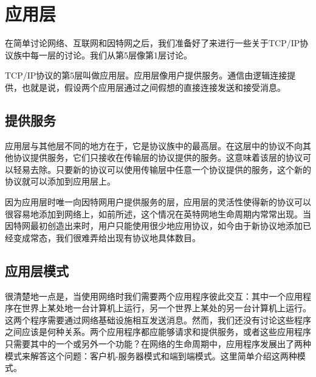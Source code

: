 \section{应用层}
在简单讨论网络、互联网和因特网之后，我们准备好了来进行一些关于TCP/IP协议族中每一层的讨论。我们从第5层像第1层讨论。

TCP/IP协议的第5层叫做应用层。应用层像用户提供服务。通信由逻辑连接提供，也就是说，假设两个应用层通过之间假想的直接连接发送和接受消息。

\subsection{提供服务}
应用层与其他层不同的地方在于，它是协议族中的最高层。在这层中的协议不向其他协议提供服务，它们只接收在传输层的协议提供的服务。这意味着该层的协议可以轻易去除。只要新的协议可以使用传输层中任意一个协议提供的服务，这个新的协议就可以添加到应用层上。

因为应用层时唯一向因特网用户提供服务的层，应用层的灵活性使得新的协议可以很容易地添加到网络上，如前所述，这个情况在英特网地生命周期内常常出现。当因特网最初创造出来时，用户只能使用很少地应用协议，如今由于新协议地添加已经变成常态，我们很难弄给出现有协议地具体数目。

\subsection{应用层模式}
很清楚地一点是，当使用网络时我们需要两个应用程序彼此交互：其中一个应用程序在世界上某处地一台计算机上运行，另一个世界上某处的另一台计算机上运行。这两个程序需要通过网络基础设施相互发送消息。然而，我们还没有讨论这些程序之间应该是何种关系。两个应用程序都应能够请求和提供服务，或者这些应用程序只需要其中的一个或另外一个功能？在网络的生命周期中，应用程序发展出了两种模式来解答这个问题：客户机-服务器模式和端到端模式。这里简单介绍这两种模式。

